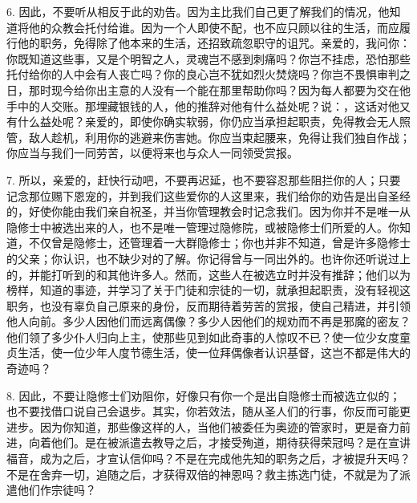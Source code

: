 6. 因此，不要听从相反于此的劝告。因为主比我们自己更了解我们的情况，他知道将他的众教会托付给谁。因为一个人即使不配，也不应只顾以往的生活，而应履行他的职务，免得除了他本来的生活，还招致疏忽职守的诅咒。亲爱的，我问你：你既知道这些事，又是个明智之人，灵魂岂不感到刺痛吗？你岂不挂虑，恐怕那些托付给你的人中会有人丧亡吗？你的良心岂不犹如烈火焚烧吗？你岂不畏惧审判之日，那时现今给你出主意的人没有一个能在那里帮助你吗？因为每人都要为交在他手中的人交账。那埋藏银钱的人，他的推辞对他有什么益处呢？说：，这话对他又有什么益处呢？亲爱的，即使你确实软弱，你仍应当承担起职责，免得教会无人照管，敌人趁机，利用你的逃避来伤害她。你应当束起腰来，免得让我们独自作战；你应当与我们一同劳苦，以便将来也与众人一同领受赏报。\par

7. 所以，亲爱的，赶快行动吧，不要再迟延，也不要容忍那些阻拦你的人；只要记念那位赐下恩宠的，并到我们这些爱你的人这里来，我们给你的劝告是出自圣经的，好使你能由我们亲自祝圣，并当你管理教会时记念我们。因为你并不是唯一从隐修士中被选出来的人，也不是唯一管理过隐修院，或被隐修士们所爱的人。你知道，不仅曾是隐修士，还管理着一大群隐修士；你也并非不知道，曾是许多隐修士的父亲；你认识，也不缺少对的了解。你记得曾与一同出外的。也许你还听说过上的，并能打听到的和其他许多人。然而，这些人在被选立时并没有推辞；他们以为榜样，知道的事迹，并学习了关于门徒和宗徒的一切，就承担起职责，没有轻视这职务，也没有辜负自己原来的身份，反而期待着劳苦的赏报，使自己精进，并引领他人向前。多少人因他们而远离偶像？多少人因他们的规劝而不再是邪魔的密友？他们领了多少仆人归向上主，使那些见到如此奇事的人惊叹不已？使一位少女度童贞生活，使一位少年人度节德生活，使一位拜偶像者认识基督，这岂不都是伟大的奇迹吗？\par

8. 因此，不要让隐修士们劝阻你，好像只有你一个是出自隐修士而被选立似的；也不要找借口说自己会退步。其实，你若效法，随从圣人们的行事，你反而可能更进步。因为你知道，那些像这样的人，当他们被委任为奥迹的管家时，更是奋力前进，向着他们。是在被派遣去教导之后，才接受殉道，期待获得荣冠吗？是在宣讲福音，成为之后，才宣认信仰吗？不是在完成他先知的职务之后，才被提升天吗？不是在舍弃一切，追随之后，才获得双倍的神恩吗？救主拣选门徒，不就是为了派遣他们作宗徒吗？\par

